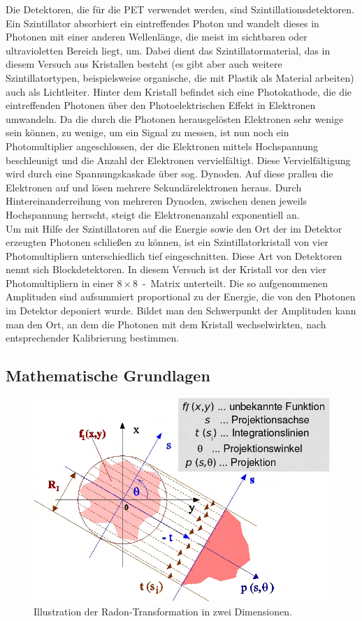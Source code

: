 \documentclass[slug=PET, room=Andreas-Schubert-Bau\,\ 424A, supervisor=Carsten\ Bittrich, coursedate=10.\ 01.\ 2020]{../../Lab_Report_LaTeX/lab_report}
\begin{document}
Die Detektoren, die für die PET verwendet werden, sind
Szintillationsdetektoren.  Ein Szintillator absorbiert ein
eintreffendes Photon und wandelt dieses in Photonen mit einer anderen
Wellenlänge, die meist im sichtbaren oder ultravioletten Bereich
liegt, um.  Dabei dient das Szintillatormaterial, das in diesem
Versuch aus Kristallen besteht (es gibt aber auch weitere
Szintillatortypen, beispielsweise organische, die mit Plastik als
Material arbeiten) auch als Lichtleiter.  Hinter dem Kristall befindet
sich eine Photokathode, die die eintreffenden Photonen über den
Photoelektrischen Effekt in Elektronen umwandeln. Da die durch die
Photonen herausgelösten Elektronen sehr wenige sein können, zu wenige,
um ein Signal zu messen, ist nun noch ein Photomultiplier
angeschlossen, der die Elektronen mittels Hochspannung beschleunigt
und die Anzahl der Elektronen vervielfältigt. Diese Vervielfältigung
wird durch eine Spannungskaskade über sog. Dynoden. Auf diese prallen
die Elektronen auf und lösen mehrere Sekundärelektronen heraus. Durch
Hintereinanderreihung von mehreren Dynoden, zwischen denen jeweils
Hochspannung herrscht, steigt die Elektronenanzahl exponentiell an.\\

Um mit Hilfe der Szintillatoren auf die Energie sowie den Ort der im
Detektor erzeugten Photonen schließen zu können, ist ein
Szintillatorkristall von vier Photomultipliern unterschiedlich tief
eingeschnitten. Diese Art von Detektoren nennt sich
Blockdetektoren. In diesem Versuch ist der Kristall vor den vier
Photomultipliern in einer \(8\times 8\)~-~Matrix unterteilt.  Die so
aufgenommenen Amplituden sind aufsummiert proportional zu der Energie,
die von den Photonen im Detektor deponiert wurde. Bildet man den
Schwerpunkt der Amplituden kann man den Ort, an dem die Photonen mit
dem Kristall wechselwirkten, nach
entsprechender Kalibrierung bestimmen.

\subsection{Mathematische Grundlagen}
\label{sec:maths}
\begin{figure}
 \includegraphics[width=.4\textwidth]{radon.png}
 \caption{Illustration der Radon-Transformation in zwei Dimensionen.}
 \label{fig:radonillu}
\end{figure}
\end{document}
